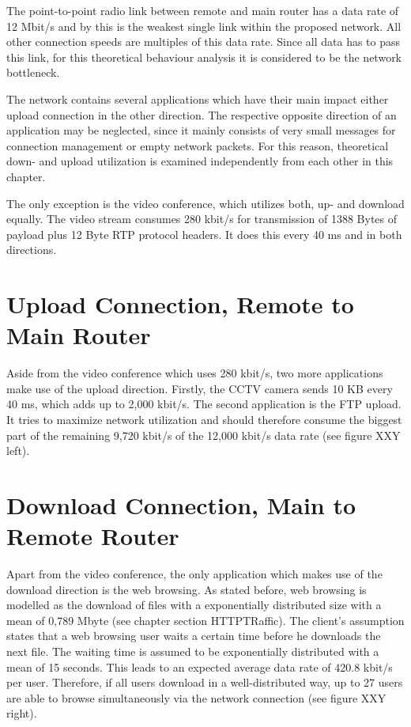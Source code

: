 \documentclass[a4paper,10pt]{book}\usepackage{graphicx}
\begin{document}
The point-to-point radio link between remote and main router has a data rate 
of 12 Mbit/s and by this is the weakest single link within the proposed network. 
All other connection speeds are multiples of this data rate. Since all data has 
to pass this link, for this theoretical behaviour analysis it is considered to 
be the network bottleneck.

The network contains several applications which have their main impact either
upload connection in the other direction. The respective opposite direction of an
 application may be neglected, since it mainly consists of very small messages for connection management or empty network packets. For 
 this reason, theoretical down- and upload utilization is examined independently from each other in this chapter. 

The only exception is the video conference, which utilizes both, up- and download 
equally. The video stream consumes 280 kbit/s for transmission of 1388 Bytes of 
payload plus 12 Byte RTP protocol headers. It does this every 40 ms and in both 
directions.

\section{Upload Connection, Remote to Main Router}

Aside from the video conference which uses 280 kbit/s, two more applications make use of the upload direction. Firstly, the CCTV camera 
sends 10 KB every 40 ms, which adds up to 2,000 kbit/s. The second application is the FTP upload. It tries to maximize 
network utilization and should therefore consume the biggest part of the remaining 9,720 kbit/s of the 12,000 kbit/s data rate 
(see figure XXY left).

\section{Download Connection, Main to Remote Router}

Apart from the video conference, the only application which makes use of the download direction is the web browsing. 
As stated before, web browsing is modelled as the download of files with a exponentially distributed size with a mean of 
0,789 Mbyte (see chapter section HTTPTRaffic). The client's assumption states that a web browsing user waits a certain time before he 
downloads the next file. The waiting time is assumed to be exponentially distributed with a mean of 15 seconds. 
This leads to an expected average data rate of 420.8 kbit/s per user. Therefore, if all users download in a well-distributed way, 
up to 27 users are able to browse simultaneously via the network connection (see figure XXY right).
\end{document}
